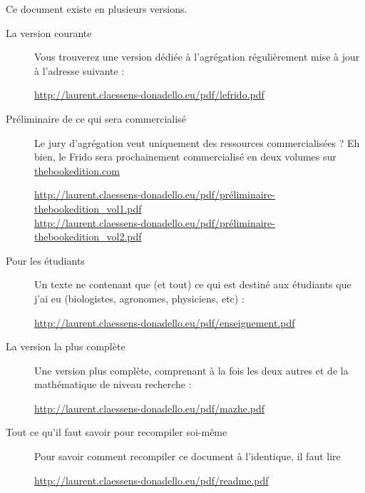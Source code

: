 
\thispagestyle{empty}

Ce document existe en plusieurs versions.
\begin{description}

    \item[La version courante] 

        Vous trouverez une version dédiée à l'agrégation régulièrement mise à jour à l'adresse suivante :
        \begin{center}
            \url{http://laurent.claessens-donadello.eu/pdf/lefrido.pdf}
        \end{center}

    \item[Préliminaire de ce qui sera commercialisé]

        Le jury d'agrégation veut uniquement des ressources commercialisées ? Eh bien, le Frido sera prochainement commercialisé en deux volumes sur \href{http://www.thebookedition.com/fr/}{thebookedition.com}
        \begin{center}
            \url{http://laurent.claessens-donadello.eu/pdf/préliminaire-thebookedition_vol1.pdf}\\
            \url{http://laurent.claessens-donadello.eu/pdf/préliminaire-thebookedition_vol2.pdf}
        \end{center}
        
    \item[Pour les étudiants]

        Un texte ne contenant que (et tout) ce qui est destiné aux étudiants que j'ai eu (biologistes, agronomes, physiciens, etc) :
        \begin{center}
        \url{http://laurent.claessens-donadello.eu/pdf/enseignement.pdf}
        \end{center}

    \item[La version la plus complète]

        Une version plus complète, comprenant à la fois les deux autres et de la mathématique de niveau recherche : 
        \begin{center}
        \url{http://laurent.claessens-donadello.eu/pdf/mazhe.pdf}
        \end{center}

    \item[Tout ce qu'il faut savoir pour recompiler soi-même]
        Pour savoir comment recompiler ce document à l'identique, il faut lire
        \begin{center}
            \url{http://laurent.claessens-donadello.eu/pdf/readme.pdf}
        \end{center}

\end{description}
